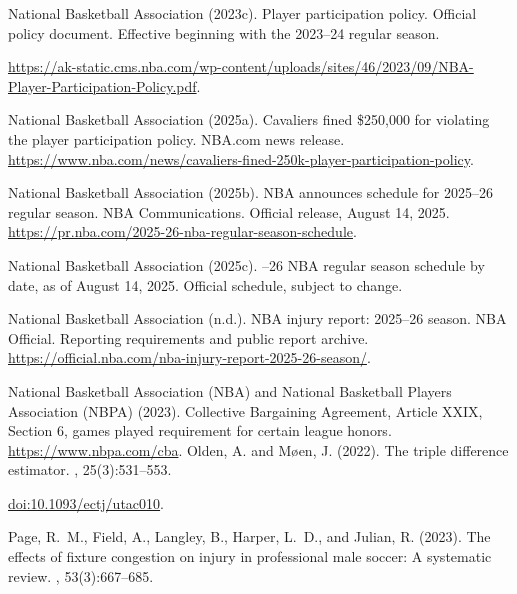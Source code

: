 \documentclass[11pt]{article}
\begin{document}
\begin{thebibliography}{}
{National Basketball Association} (2023c).
\newblock Player participation policy.
\newblock Official policy document.
\newblock Effective beginning with the 2023--24 regular season.

\newblock \url{https://ak-static.cms.nba.com/wp-content/uploads/sites/46/2023/09/NBA-Player-Participation-Policy.pdf}.\par
{}
{National Basketball Association} (2025a).
\newblock Cavaliers fined \$250,000 for violating the player participation policy.
\newblock NBA.com news release.
\newblock \url{https://www.nba.com/news/cavaliers-fined-250k-player-participation-policy}.

{National Basketball Association} (2025b).
\newblock NBA announces schedule for 2025--26 regular season.
\newblock NBA Communications.
\newblock Official release, August 14, 2025.
\newblock \url{https://pr.nba.com/2025-26-nba-regular-season-schedule}.

{National Basketball Association} (2025c).
--26 NBA regular season schedule by date, as of August 14, 2025.
\newblock Official schedule, subject to change.

{National Basketball Association} (n.d.).
\newblock NBA injury report: 2025--26 season.
\newblock NBA Official. Reporting requirements and public report archive.
\newblock \url{https://official.nba.com/nba-injury-report-2025-26-season/}.\par

National Basketball Association (NBA) and National Basketball Players Association (NBPA) (2023).
\newblock Collective Bargaining Agreement, Article XXIX, Section 6, games played requirement for certain league honors.
\newblock \url{https://www.nbpa.com/cba}.
Olden, A. and M{\o}en, J. (2022).
\newblock The triple difference estimator.
, 25(3):531--553.

\newblock \href{https://doi.org/10.1093/ectj/utac010}{doi:10.1093/ectj/utac010}.\par
{}
Page, R.~M., Field, A., Langley, B., Harper, L.~D., and Julian, R. (2023).
\newblock The effects of fixture congestion on injury in professional male
  soccer: A systematic review.
, 53(3):667--685.


\end{thebibliography}
\end{document}

